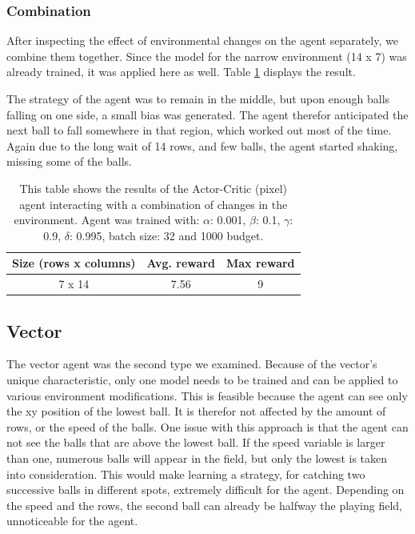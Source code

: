 \documentclass{article}
\begin{document}
\subsubsection{Combination}
After inspecting the effect of environmental changes on the agent separately, we combine them together. 
Since the model for the narrow environment (14 x 7) was already trained, it was applied here as well. 
Table \ref{tab:Pixel-comb} displays the result.

The strategy of the agent was to remain in the middle, but upon enough balls falling on one side, a small bias was generated. 
The agent therefor anticipated the next ball to fall somewhere in that region, which worked out most of the time.
Again due to the long wait of 14 rows, and few balls, the agent started shaking, missing some of the balls. 

\begin{table}[htbp]
    \centering
    \begin{tabular}{|c|c|c|}
        \hline
        \textbf{Size (rows x columns)} & \textbf{Avg. reward} & \textbf{Max reward} \\
        \hline
        7 x 14                & 7.56        & 9    \\
        \hline              
    \end{tabular}
    \caption{This table shows the results of the Actor-Critic (pixel) agent interacting with a combination of changes in the environment. 
    Agent was trained with: $\alpha$: 0.001, $\beta$: 0.1, $\gamma$: 0.9, $\delta$: 0.995, batch size: 32 and 1000 budget. }
    \label{tab:Pixel-comb}
\end{table}


\subsection{Vector}
\label{ENV-vars}
The vector agent was the second type we examined.
Because of the vector's unique characteristic, only one model needs to be trained and can be applied to various environment modifications.
This is feasible because the agent can see only the xy position of the lowest ball. 
It is therefor not affected by the amount of rows, or the speed of the balls.
One issue with this approach is that the agent can not see the balls that are above the lowest ball.
If the speed variable is larger than one, numerous balls will appear in the field, but only the lowest is taken into consideration.
This would make learning a strategy, for catching two successive balls in different spots, extremely difficult for the agent. 
Depending on the speed and the rows, the second ball can already be halfway the playing field, unnoticeable for the agent. 
\end{document}

